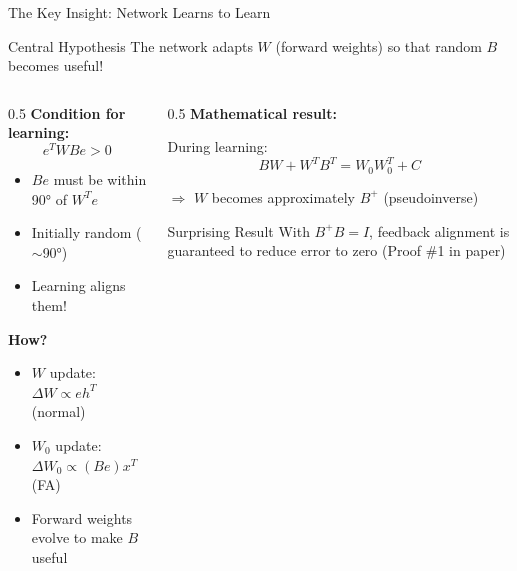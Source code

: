 \documentclass[aspectratio=169,10pt]{beamer}
\begin{document}
\begin{frame}{The Key Insight: Network Learns to Learn}
  \begin{block}{Central Hypothesis}
    The network adapts $W$ (forward weights) so that random $B$ becomes useful!
  \end{block}

  \vspace{0.3cm}
  \begin{columns}[T]
    \begin{column}{0.5\textwidth}
      \textbf{Condition for learning:}
      \[
      e^T W B e > 0
      \]

      \begin{itemize}
        \item $Be$ must be within 90° of $W^T e$
        \item Initially random ($\sim$90°)
        \item Learning aligns them!
      \end{itemize}

      \textbf{How?}
      \begin{itemize}
        \item $W$ update: $\Delta W \propto e h^T$ (normal)
        \item $W_0$ update: $\Delta W_0 \propto (Be) x^T$ (FA)
        \item Forward weights evolve to make $B$ useful
      \end{itemize}
    \end{column}

    \begin{column}{0.5\textwidth}
      \textbf{Mathematical result:}

      During learning:
      \[
      BW + W^T B^T = W_0 W_0^T + C
      \]

      \vspace{0.2cm}
      $\Rightarrow$ $W$ becomes approximately $B^+$ (pseudoinverse)

      \vspace{0.5cm}
      \begin{alertblock}{Surprising Result}
        With $B^+B = I$, feedback alignment is guaranteed to reduce error to zero (Proof \#1 in paper)
      \end{alertblock}
    \end{column}
  \end{columns}
\end{frame}
\end{document}
